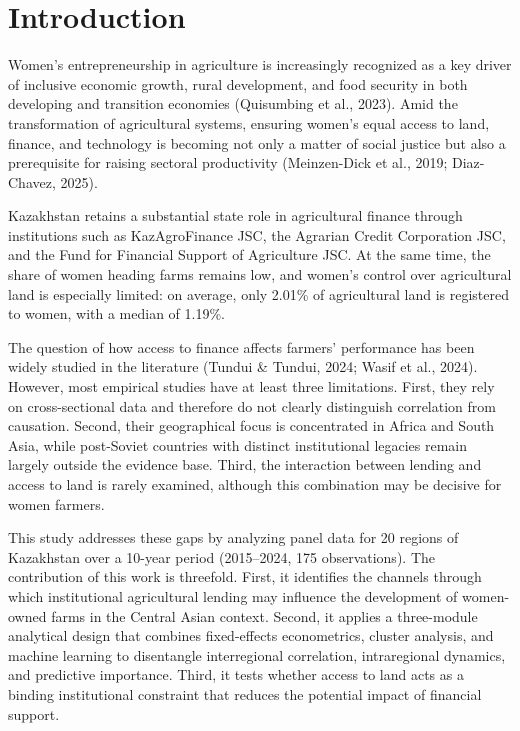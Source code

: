 ﻿\documentclass[sn-mathphys-num]{sn-jnl}
\newcommand{\hl}[1]{#1}
\begin{document}
\section{Introduction}\label{sec:introduction}

Women's entrepreneurship in agriculture is increasingly recognized as a key driver of inclusive economic growth, rural development, and food security in both developing and transition economies (\hl{Quisumbing et al., 2023}). Amid the transformation of agricultural systems, ensuring women's equal access to land, finance, and technology is becoming not only a matter of social justice but also a prerequisite for raising sectoral productivity (\hl{Meinzen-Dick et al., 2019; Diaz-Chavez, 2025}).

Kazakhstan retains a substantial state role in agricultural finance through institutions such as KazAgroFinance JSC, the Agrarian Credit Corporation JSC, and the Fund for Financial Support of Agriculture JSC. At the same time, the share of women heading farms remains low, and women's control over agricultural land is especially limited: on average, only 2.01\% of agricultural land is registered to women, with a median of 1.19\%.

The question of how access to finance affects farmers' performance has been widely studied in the literature (\hl{Tundui \& Tundui, 2024; Wasif et al., 2024}). However, most empirical studies have at least three limitations. First, they rely on cross-sectional data and therefore do not clearly distinguish correlation from causation. Second, their geographical focus is concentrated in Africa and South Asia, while post-Soviet countries with distinct institutional legacies remain largely outside the evidence base. Third, the interaction between lending and access to land is rarely examined, although this combination may be decisive for women farmers.

This study addresses these gaps by analyzing panel data for 20 regions of Kazakhstan over a 10-year period (2015--2024, 175 observations). The contribution of this work is threefold. First, it identifies the channels through which institutional agricultural lending may influence the development of women-owned farms in the Central Asian context. Second, it applies a three-module analytical design that combines fixed-effects econometrics, cluster analysis, and machine learning to disentangle interregional correlation, intraregional dynamics, and predictive importance. Third, it tests whether access to land acts as a binding institutional constraint that reduces the potential impact of financial support.
\end{document}
